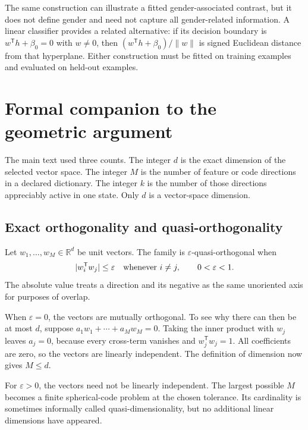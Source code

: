 \documentclass[
  aps,
  reprint,
  superscriptaddress,
  floatfix,
  nofootinbib,
  longbibliography
]{revtex4-2}
\newcommand{\R}{\mathbb{R}}
\newcommand{\T}{^{\mathsf T}}
\newcommand{\norm}[1]{\lVert #1\rVert}
\begin{document}
The same construction can illustrate a fitted gender-associated contrast,
but it does not define gender and need not capture all gender-related
information.  A linear classifier provides a related alternative: if its
decision boundary is $w\T h+\beta_0=0$ with $w\ne0$, then
$(w\T h+\beta_0)/\norm w$ is signed Euclidean distance from that hyperplane.
Either construction must be fitted on training examples and evaluated on
held-out examples.

\section{Formal companion to the geometric argument}
\label{app:geometry}

The main text used three counts.  The integer $d$ is the exact dimension of
the selected vector space.  The integer $M$ is the number of feature or code
directions in a declared dictionary.  The integer $k$ is the number of those
directions appreciably active in one state.  Only $d$ is a vector-space
dimension.

\subsection{Exact orthogonality and quasi-orthogonality}

Let $w_1,\ldots,w_M\in\R^d$ be unit vectors.  The family is
$\varepsilon$-quasi-orthogonal when
\begin{equation}
 |w_i\T w_j|\leq\varepsilon
 \quad\hbox{whenever }i\ne j,
 \qquad 0<\varepsilon<1.
 \label{eq:quasi-app}
\end{equation}
The absolute value treats a direction and its negative as the same
unoriented axis for purposes of overlap.

When $\varepsilon=0$, the vectors are mutually orthogonal.  To see why there
can then be at most $d$, suppose
$a_1w_1+\cdots+a_Mw_M=0$.  Taking the inner product with $w_j$ leaves
$a_j=0$, because every cross-term vanishes and $w_j\T w_j=1$.  All
coefficients are zero, so the vectors are linearly independent.  The
definition of dimension now gives $M\leq d$.

For $\varepsilon>0$, the vectors need not be linearly independent.  The
largest possible $M$ becomes a finite spherical-code problem at the chosen
tolerance.  Its cardinality is sometimes informally called
quasi-dimensionality, but no additional linear dimensions have appeared.
\end{document}

